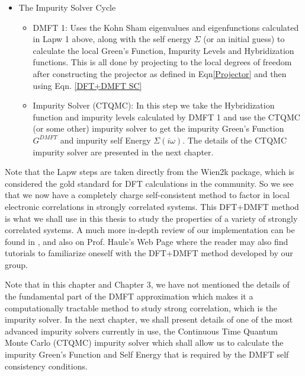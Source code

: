\documentclass[10pt]{ruthesis}
\begin{document}
\begin{itemize}
\item The Impurity Solver Cycle 
	\begin{itemize}
	\item DMFT 1: Uses the Kohn Sham eigenvalues and eigenfunctions calculated in Lapw 1 above, along with the self energy $\Sigma$ (or an initial guess) to calculate the local Green's Function, Impurity Levels and Hybridization functions. This is all done by projecting to the local degrees of freedom after constructing the projector  	as defined in Eqn\ref{Projector} and then using Eqn. \ref{DFT+DMFT SC} 
	
	\item Impurity Solver (CTQMC): In this step we take the Hybridization function and impurity levels calculated by DMFT 1 and use the CTQMC (or some other) impurity solver to get the impurity Green's Function $G^{DMFT}$ and impurity self Energy $\Sigma(i\omega)$. The details of the CTQMC impurity solver are presented in the next chapter.   
	\end{itemize}	
\end{itemize}

Note that the Lapw steps are taken directly from the Wien2k package, which is considered the gold standard for DFT calculations in the community.  So we see that we now have a completely charge self-consistent method to factor in local electronic correlations in strongly correlated systems. This DFT+DMFT method is what we shall use in this thesis to study the properties of a variety of strongly correlated systems. A much more in-depth review of our implementation  can be found in \cite{Chuck_prb}, and also on Prof. Haule's Web Page \footnotemark where the reader may also find tutorials to familiarize oneself with the DFT+DMFT method developed by our group. 

	
Note that in this chapter and Chapter 3, we have not mentioned the details of the fundamental part of the DMFT approximation which makes it a computationally tractable method to study strong correlation, which is the impurity solver. In the next chapter, we shall present details of one of the most advanced impurity solvers currently in use, the Continuous Time Quantum Monte Carlo (CTQMC) impurity solver which shall allow us to calculate the impurity Green's Function and Self Energy that is required by the DMFT self consistency conditions.
\end{document}
